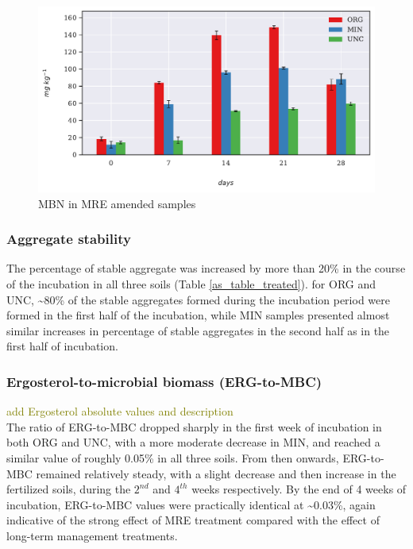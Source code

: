 \documentclass[12pt]{report}
\newcommand{\myGreen}[1]{\textcolor{olive}{#1}} %
\begin{document}
		\begin{figure}[H]
			\centering
			\includegraphics[scale=0.8]{thesis_figures/main_incubation/MRE_treated/MBN.pdf}
			\caption{MBN in MRE amended samples}
			\label{fig:mbn_treated_main}
		\end{figure}
		
			
	\subsubsection{Aggregate stability}
		
		The percentage of stable aggregate was increased by more than 20\% in the course of the incubation in all three soils (Table \ref{as_table_treated}). for ORG and UNC, \~{}80\% of the stable aggregates formed during the incubation period were formed in the first half of the incubation, while MIN samples presented almost similar increases in percentage of stable aggregates in the second half as in the first half of incubation. \\
			
		

		
		
	\subsubsection{Ergosterol-to-microbial biomass (ERG-to-MBC)}
	
		\myGreen{add Ergosterol absolute values and description}\\
		The ratio of ERG-to-MBC dropped sharply in the first week of incubation in both ORG and UNC, with a more moderate decrease in 	MIN, and reached a similar value of  roughly 0.05\% in all three soils. From then onwards, ERG-to-MBC remained relatively steady, with a slight decrease and then increase in the fertilized soils, during the $2^{nd}$ and $ 4^{th} $ weeks respectively. By the end of 4 weeks of incubation,  ERG-to-MBC values were practically identical at \~{}0.03\%, again indicative of the strong effect of MRE treatment compared with the effect of long-term management treatments.
		
\end{document}
